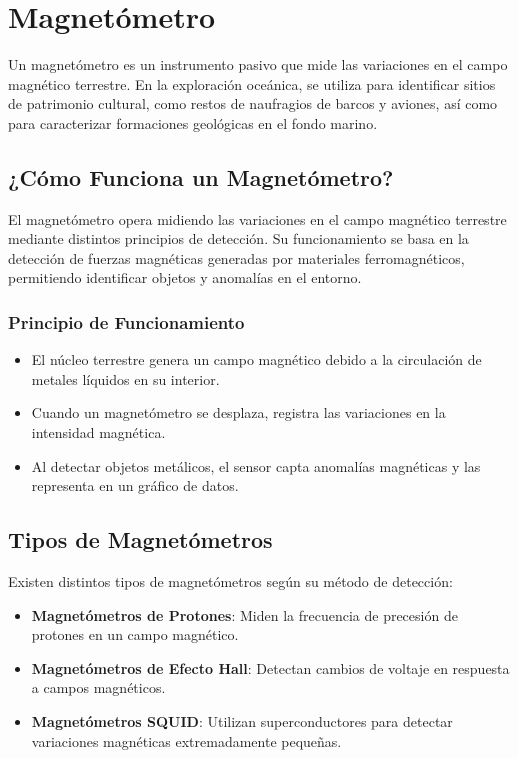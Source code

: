 \documentclass{article}
\begin{document}
	\section{Magnetómetro} Un magnetómetro es un instrumento pasivo que mide las variaciones en el campo magnético terrestre. En la exploración oceánica, se utiliza para identificar sitios de patrimonio cultural, como restos de naufragios de barcos y aviones, así como para caracterizar formaciones geológicas en el fondo marino.
	
	\subsection{¿Cómo Funciona un Magnetómetro?}
	El magnetómetro opera midiendo las variaciones en el campo magnético terrestre mediante distintos principios de detección. Su funcionamiento se basa en la detección de fuerzas magnéticas generadas por materiales ferromagnéticos, permitiendo identificar objetos y anomalías en el entorno.  
	
	\subsubsection{Principio de Funcionamiento}
	\begin{itemize}
		\item El núcleo terrestre genera un campo magnético debido a la circulación de metales líquidos en su interior.
		\item Cuando un magnetómetro se desplaza, registra las variaciones en la intensidad magnética.
		\item Al detectar objetos metálicos, el sensor capta anomalías magnéticas y las representa en un gráfico de datos.
	\end{itemize}
	
	\subsection{Tipos de Magnetómetros}
	Existen distintos tipos de magnetómetros según su método de detección:
	\begin{itemize}
		\item \textbf{Magnetómetros de Protones}: Miden la frecuencia de precesión de protones en un campo magnético.
		\item \textbf{Magnetómetros de Efecto Hall}: Detectan cambios de voltaje en respuesta a campos magnéticos.
		\item \textbf{Magnetómetros SQUID}: Utilizan superconductores para detectar variaciones magnéticas extremadamente pequeñas.
	\end{itemize}
\end{document}
